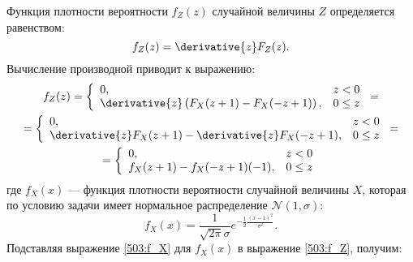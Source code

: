 Функция плотности вероятности $f_Z(z)$ случайной величины $Z$ определяется равенством:
\begin{equation}
    f_Z(z) = \derivative{z} F_Z(z) .
\end{equation}
Вычисление производной приводит к выражению:
\begin{multline}
    \label{503:f_Z}
    f_Z(z)
    = \left \{
    \begin{array}{ll}
        0,                                                        & z < 0    \\
        \derivative{z} \left ( F_X(z + 1) - F_X(-z + 1) \right ), & 0 \leq z
    \end{array}
    \right . = \\
    = \left \{
    \begin{array}{ll}
        0,                                                      & z < 0    \\
        \derivative{z} F_X(z + 1) - \derivative{z} F_X(-z + 1), & 0 \leq z
    \end{array}
    \right . = \\
    = \left \{
    \begin{array}{ll}
        0,                            & z < 0    \\
        f_X(z + 1) - f_X(-z + 1)(-1), & 0 \leq z
    \end{array}
    \right .
\end{multline}
где $f_X(x)$ --- функция плотности вероятности случайной величины $X$, которая по условию задачи имеет нормальное распределение $\mathcal{N}(1,\sigma)$:
\begin{equation}
    \label{503:f_X}
    f_X(x) = \frac{1}{\sqrt{2 \pi} \sigma} e^{-\frac{1}{2} \frac{\left ( x - 1 \right )^2}{\sigma^2}} .
\end{equation}
Подставляя выражение \eqref{503:f_X} для $f_X(x)$ в выражение \eqref{503:f_Z}, получим:
